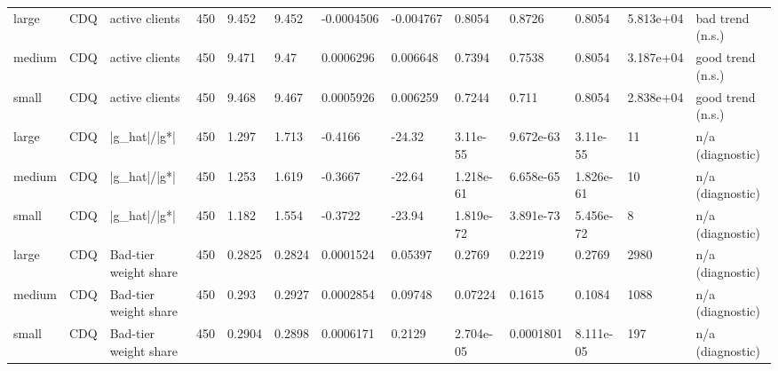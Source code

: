 \begin{table}[t]
\begin{tabular}{lllllllllllll}
large & CDQ & active clients & 450 & 9.452 & 9.452 & -0.0004506 & -0.004767 & 0.8054 & 0.8726 & 0.8054 & 5.813e+04 & bad trend (n.s.) \\
medium & CDQ & active clients & 450 & 9.471 & 9.47 & 0.0006296 & 0.006648 & 0.7394 & 0.7538 & 0.8054 & 3.187e+04 & good trend (n.s.) \\
small & CDQ & active clients & 450 & 9.468 & 9.467 & 0.0005926 & 0.006259 & 0.7244 & 0.711 & 0.8054 & 2.838e+04 & good trend (n.s.) \\
large & CDQ & |g\_hat|/|g*| & 450 & 1.297 & 1.713 & -0.4166 & -24.32 & 3.11e-55 & 9.672e-63 & 3.11e-55 & 11 & n/a (diagnostic) \\
medium & CDQ & |g\_hat|/|g*| & 450 & 1.253 & 1.619 & -0.3667 & -22.64 & 1.218e-61 & 6.658e-65 & 1.826e-61 & 10 & n/a (diagnostic) \\
small & CDQ & |g\_hat|/|g*| & 450 & 1.182 & 1.554 & -0.3722 & -23.94 & 1.819e-72 & 3.891e-73 & 5.456e-72 & 8 & n/a (diagnostic) \\
large & CDQ & Bad-tier weight share & 450 & 0.2825 & 0.2824 & 0.0001524 & 0.05397 & 0.2769 & 0.2219 & 0.2769 & 2980 & n/a (diagnostic) \\
medium & CDQ & Bad-tier weight share & 450 & 0.293 & 0.2927 & 0.0002854 & 0.09748 & 0.07224 & 0.1615 & 0.1084 & 1088 & n/a (diagnostic) \\
small & CDQ & Bad-tier weight share & 450 & 0.2904 & 0.2898 & 0.0006171 & 0.2129 & 2.704e-05 & 0.0001801 & 8.111e-05 & 197 & n/a (diagnostic) \\
\bottomrule
\end{tabular}
\end{table}